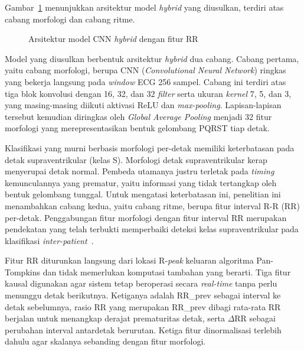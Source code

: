 Gambar~\ref{fig:pipeline-training} menunjukkan arsitektur model \textit{hybrid} yang diusulkan, terdiri atas cabang morfologi dan cabang ritme.

\begin{figure}[H]
  \centering
  \caption{Arsitektur model CNN \textit{hybrid} dengan fitur RR}
  \label{fig:pipeline-training}
\end{figure}

Model yang diusulkan berbentuk arsitektur \textit{hybrid} dua cabang. Cabang
pertama, yaitu cabang morfologi, berupa CNN
(\textit{Convolutional Neural Network}) ringkas yang bekerja langsung
pada \textit{window} ECG 256 sampel. Cabang ini terdiri atas tiga blok konvolusi dengan
16, 32, dan 32 \textit{filter} serta ukuran \textit{kernel} 7, 5, dan 3, yang
masing-masing diikuti aktivasi ReLU dan \textit{max-pooling}. Lapisan-lapisan
tersebut kemudian diringkas oleh \textit{Global Average Pooling} menjadi 32
fitur morfologi yang merepresentasikan bentuk gelombang PQRST tiap detak.

Klasifikasi yang murni berbasis morfologi per-detak memiliki keterbatasan pada
detak supraventrikular (kelas S). Morfologi detak supraventrikular kerap
menyerupai detak normal. Pembeda utamanya justru terletak pada
\textit{timing} kemunculannya yang prematur, yaitu informasi yang tidak
tertangkap oleh bentuk gelombang tunggal. Untuk mengatasi keterbatasan ini,
penelitian ini menambahkan cabang kedua, yaitu cabang ritme, berupa fitur
interval R-R (RR) per-detak. Penggabungan fitur
morfologi dengan fitur interval RR merupakan pendekatan yang telah terbukti
memperbaiki deteksi kelas supraventrikular pada klasifikasi
\textit{inter-patient}~\cite{dechazal_2004}.

Fitur RR diturunkan langsung dari lokasi R-\textit{peak} keluaran algoritma
Pan-Tompkins dan tidak
memerlukan komputasi tambahan yang berarti. Tiga fitur kausal digunakan agar
sistem tetap beroperasi secara \textit{real-time} tanpa perlu menunggu detak
berikutnya. Ketiganya adalah RR\_prev sebagai interval ke detak sebelumnya, rasio RR
yang merupakan RR\_prev dibagi rata-rata RR berjalan untuk menangkap derajat
prematuritas detak, serta $\Delta$RR sebagai perubahan interval antardetak
berurutan. Ketiga fitur dinormalisasi terlebih dahulu agar skalanya sebanding
dengan fitur morfologi.


